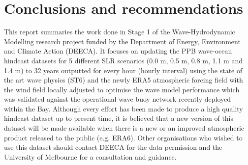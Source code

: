 \documentclass[12pt]{article}
\begin{document}
\section{Conclusions and recommendations}

This report summaries the work done in Stage 1 of the Wave-Hydrodynamic Modelling research project funded by the Department of Energy, Environment and Climate Action (DEECA). It focuses on updating the PPB wave-ocean hindcast datasets  for 5 different SLR scenarios (0.0 m, 0.5 m, 0.8 m, 1.1 m and 1.4 m) to 32 years outputted for every hour (hourly interval) using the state of the art wave physics (ST6) and the newly ERA5 atmospheric forcing field with the wind field locally adjusted to optimise the wave model performance which was validated against the operational wave buoy network recently deployed within the Bay.  
Although every effort has been made to produce a high quality hindcast dataset up to present time, it is believed that a new version of this dataset will be made available when there is a new or an improved atmospheric product released to the public (e.g. ERA6). Other organisations who wished to use this dataset should contact DEECA for the data permission and the University of Melbourne for a consultation and guidance. 

\end{document}
